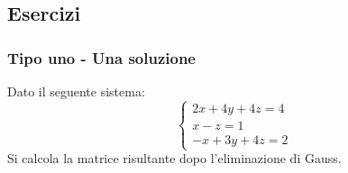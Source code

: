 \documentclass[a4paper]{article}
\begin{document}
	\subsection{Esercizi}
	
	\subsubsection{Tipo uno - Una soluzione}
	
	Dato il seguente sistema:
	\begin{equation*}
		\begin{cases}
			2x + 4y + 4z = 4 \\
			x - z = 1 \\
			-x + 3y + 4z = 2
		\end{cases}
	\end{equation*}
	Si calcola la matrice risultante dopo l'eliminazione di Gauss.\newline
	
\end{document}
